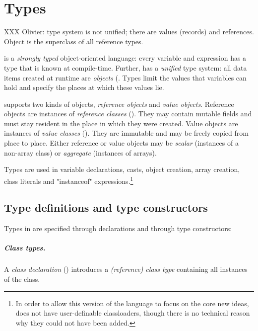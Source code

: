 \chapter{Types}
\label{XtenTypes}

XXX Olivier: type system is not unified; there are values
(records) and references.
Object is the superclass of all reference types.

{}\Xten{} is a {\em strongly typed} object-oriented language: every variable
and expression has a type that is known at compile-time. Further,
\Xten{} has a {\em unified} type system: all data items created at
runtime are {\em objects} (. Types limit the
values that variables can hold and specify the places at which these
values lie.

{}\Xten{} supports two kinds of objects, {\em reference objects} and
{\em value objects}.  Reference objects are instances of {\em
reference classes} (). They may contain
mutable fields and must stay resident in the place in which they were
created. Value objects are instances of {\em value classes}
(). They are immutable and may be freely copied
from place to place. Either reference or value objects may be 
{\em scalar} (instances of a non-array class) or {\em aggregate} (instances
of arrays).

Types are used in variable declarations, casts, object creation, array
creation, class literals and \xcd"instanceof" expressions.\footnote{In
order to allow this version of the language to focus on the core new
ideas, \XtenCurrVer{} does not have user-definable classloaders,
though there is no technical reason why they could not have been
added.}

\section{Type definitions and type constructors}

Types in \Xten{} are specified through declarations and through
type constructors:

\paragraph{Class types.}
\label{ReferenceTypes}


        A {\em class declaration} ()
        introduces a 
        {\em (reference) class type}
        containing all instances of the class.

